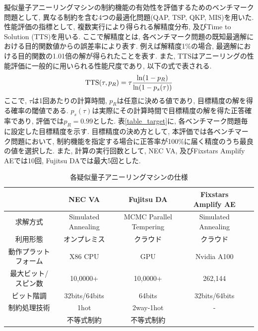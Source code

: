 \documentclass[submit,techrep,noauthor]{ipsj}
\begin{document}
擬似量子アニーリングマシンの制約機能の有効性を評価するためのベンチマーク問題として, 異なる制約を含む4つの最適化問題(QAP, TSP, QKP, MIS)を用いた. 性能評価の指標として, 複数実行により得られる解精度分布, 及びTime to Solution (TTS)を用いる. ここで解精度とは, 各ベンチマーク問題の既知最適解における目的関数値からの誤差率により表す. 例えば解精度1\%の場合, 最適解における目的関数の1.01倍の解が得られたことを表す. また, TTSはアニーリングの性能評価に一般的に用いられる性能尺度であり, 以下の式で表される.
\begin{equation}
{\rm{TTS}}(\tau, p_{R}) = \tau\frac{{\rm{ln}}(1-p_{R})}{{\rm{ln}}(1-p_{s}(\tau))} \label{tts_def}
\end{equation}
ここで, $\tau$は1回あたりの計算時間, $p_{R}$は任意に決める値であり, 目標精度の解を得る確率の閾値である. $p_{s}(\tau)$は実際にその計算時間で目標精度の解を得た正答確率であり, 評価では$p_{R}=0.99$とした. 表\ref{table_target}に, 各ベンチマーク問題毎に設定した目標精度を示す. 目標精度の決め方として, 本評価では各ベンチマーク問題において, 制約機能を指定する場合に正答率が100\%に届く精度のうち最良の値を選択した. また, 計算の実行回数として, NEC VA, 及びFixstars Amplify AEでは10回, Fujitsu DAでは最大5回とした.

\newlength{\myheight}
\setlength{\myheight}{0.8cm}

\begin{table}[tb]
\centering
  \caption{各疑似量子アニーリングマシンの仕様}
    \begin{tabular}{|c||c|c|c|c}
      \hline
      \parbox[c][\myheight][c]{0cm}{}
      & {NEC VA} & {Fujitsu DA} & {Fixstars Amplify AE}\\ \hline \hline
      求解方式 & Simulated Annealing & MCMC Parallel Tempering & Simulated Annealing\\ \hline
      利用形態 & オンプレミス & クラウド & クラウド\\ \hline
      動作プラットフォーム & X86 CPU & GPU & Nvidia A100\\ \hline
      最大ビット/スピン数 & 10,0000+ & 10,0000+ & 262,144\\ \hline
      ビット階調 & 32bits/64bits & 64bits & 32bits/64bits\\ \hline
      制約処理技術 & 1hot & 2way-1hot  & -\\ 
      {} & 不等式制約 & 不等式制約 & {}\\ \hline
  \end{tabular}
\label{table_spec}
\end{table}
\end{document}
